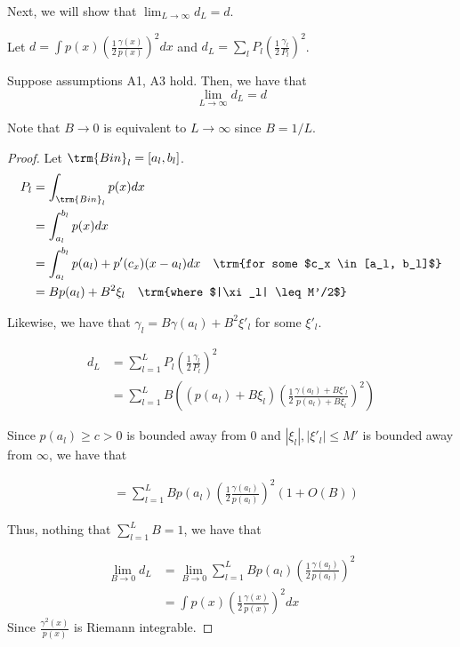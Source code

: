 \documentclass{article}
\begin{document}
Next, we will show that $\lim_{L \rightarrow \infty} d_L = d$. 

\begin{proposition}
\label{prop:convergence_discrete_continuous_renyi}

Let $d = \int p(x) \left( \frac{1}{2} \frac{\gamma(x)}{p(x)} \right)^2 dx$ and $d_L = \sum_l P_l \left( \frac{1}{2} \frac{\gamma_l}{P_l} \right)^2$. 

Suppose assumptions A1, A3 hold. Then, we have that
\[
\lim_{L \rightarrow \infty} d_L = d
\]

\end{proposition}


Note that $B \rightarrow 0$ is equivalent to $L \rightarrow \infty$ since $B = 1/L$. 

\begin{proof}

Let $\trm{Bin}_l = [a_l, b_l]$. 
\begin{align*}
P_l &= \int_{\trm{Bin}_l} p(x) dx \\
  &= \int_{a_l}^{b_l} p(x) dx \\
 &= \int_{a_l}^{b_l} p(a_l) + p'(c_x) (x - a_l) dx \quad \trm{for some $c_x \in [a_l, b_l]$}\\
 &= B p(a_l) + B^2 \xi_l \quad \trm{where $|\xi_l| \leq M'/2$}
\end{align*}

Likewise, we have that $\gamma_l = B \gamma(a_l) + B^2 \xi'_l$ for some $\xi'_l$. 

\begin{align*}
d_L &= \sum_{l=1}^L P_l \left( \frac{1}{2} \frac{\gamma_l}{P_l} \right)^2 \\
  &= \sum_{l=1}^L B \left(
     (p(a_l) + B \xi_l) \left( \frac{1}{2} \frac{\gamma(a_l) + B \xi'_l}{p(a_l) + B \xi_l} \right)^2 \right) 
\end{align*}

Since $p(a_l) \geq c > 0$ is bounded away from 0 and $|\xi_l|, |\xi'_l| \leq M'$ is bounded away from $\infty$, we have that

\begin{align*}
 &= \sum_{l=1}^L B p(a_l) \left( \frac{1}{2} \frac{\gamma(a_l)}{p(a_l)} \right)^2 (1 + O(B))
\end{align*}

Thus, nothing that $\sum_{l=1}^L B = 1$, we have that

\begin{align*}
\lim_{B \rightarrow 0} d_L &= \lim_{B \rightarrow 0} \sum_{l=1}^L B p(a_l) 
 \left( \frac{1}{2} \frac{\gamma(a_l)}{p(a_l)} \right)^2 \\
 &= \int p(x) \left( \frac{1}{2} \frac{\gamma(x)}{p(x)} \right)^2 dx
\end{align*} 
Since $ \frac{\gamma^2(x)}{p(x)}$ is Riemann integrable. 
 
\end{proof}
\end{document}
